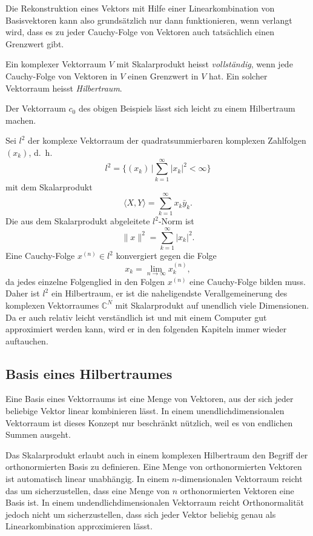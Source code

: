 Die Rekonstruktion eines Vektors mit Hilfe einer Linearkombination von
Basisvektoren kann also grundsätzlich nur dann funktionieren, wenn verlangt
wird, dass es zu jeder Cauchy-Folge von Vektoren auch tatsächlich einen
Grenzwert gibt.

\begin{definition}
Ein komplexer Vektorraum $V$ mit Skalarprodukt heisst {\em vollständig}, 
wenn jede Cauchy-Folge von Vektoren in $V$ einen Grenzwert in $V$ hat.
Ein solcher Vektorraum heisst {\em Hilbertraum}.
\end{definition}
%
%

Der Vektorraum $c_0$ des obigen Beispiels lässt sich leicht zu einem
Hilbertraum machen.

\begin{beispiel}
Sei $l^2$ der komplexe Vektorraum der quadratsummierbaren komplexen
Zahlfolgen $(x_k)$, d.~h.
%
\[
l^2 = \biggl\{ (x_k)\,\bigg| \sum_{k=1}^\infty |x_k|^2 < \infty \biggr\}
\]
mit dem Skalarprodukt
\[
\langle X,Y\rangle = \sum_{k=1}^\infty x_k\bar{y}_k.
\]
Die aus dem Skalarprodukt abgeleitete $l^2$-Norm ist
\[
\|x\|^2 = \sum_{k=1}^\infty |x_k|^2.
\]
Eine Cauchy-Folge $x^{(n)}\in l^2$ konvergiert gegen die Folge
\[
x_k = \lim_{n\to\infty} x_k^{(n)},
\]
da jedes einzelne Folgenglied in den Folgen $x^{(n)}$ eine Cauchy-Folge
bilden muss.
Daher ist $l^2$ ein Hilbertraum, er ist die naheligendste Verallgemeinerung
des komplexen Vektorraumes $\mathbb{C}^N$ mit Skalarprodukt auf unendlich
viele Dimensionen.
Da er auch relativ leicht verständlich ist und mit einem Computer gut
approximiert werden kann, wird er in den folgenden Kapiteln immer wieder
auftauchen.
\end{beispiel}

\subsection{Basis eines Hilbertraumes
\label{subsection:hilbertraum-basis}}
Eine Basis eines Vektorraums ist eine Menge von Vektoren, aus der sich
jeder beliebige Vektor linear kombinieren lässt.
In einem unendlichdimensionalen Vektorraum ist dieses Konzept nur
beschränkt nützlich, weil es von endlichen Summen ausgeht.

Das Skalarprodukt erlaubt auch in einem komplexen Hilbertraum den Begriff
der orthonormierten Basis zu definieren.
Eine Menge von orthonormierten Vektoren ist automatisch linear unabhängig.
In einem $n$-dimensionalen Vektorraum reicht das um sicherzustellen,
dass eine Menge von $n$ orthonormierten Vektoren eine Basis ist.
In einem undendlichdimensionalen Vektorraum reicht Orthonormalität
jedoch nicht um sicherzustellen, dass sich jeder Vektor beliebig genau
als Linearkombination approximieren lässt.

